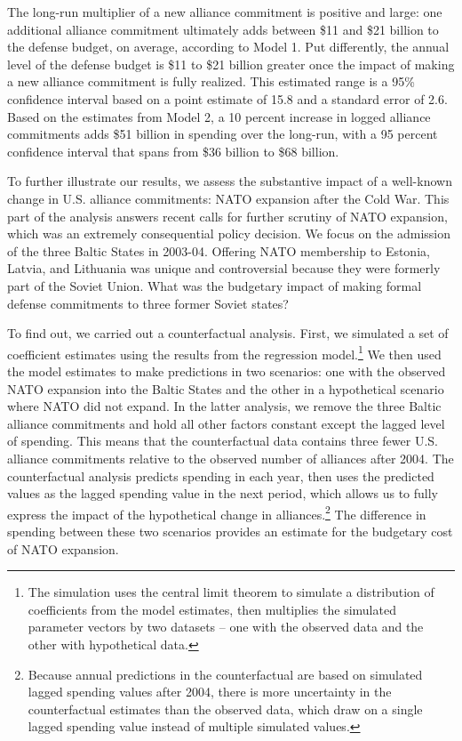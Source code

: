 \documentclass[12pt,hidelinks]{article}
\begin{document}
The long-run multiplier of a new alliance commitment is positive and large: one additional alliance commitment ultimately adds between \$11 and \$21 billion to the defense budget, on average, according to Model 1.
Put differently, the annual level of the defense budget is \$11 to \$21 billion greater once the impact of making a new alliance commitment is fully realized.
This estimated range is a 95\% confidence interval based on a point estimate of 15.8 and a standard error of 2.6. 
Based on the estimates from Model 2, a 10 percent increase in logged alliance commitments adds \$51 billion in spending over the long-run, with a 95 percent confidence interval that spans from \$36 billion to \$68 billion.


To further illustrate our results, we assess the substantive impact of a well-known change in U.S. alliance commitments: NATO expansion after the Cold War. 
This part of the analysis answers recent calls for further scrutiny of NATO expansion, which was an extremely consequential policy decision.\autocite{GoldgeierShifrinson2020}
We focus on the admission of the three Baltic States in 2003-04. 
Offering NATO membership to Estonia, Latvia, and Lithuania was unique and controversial because they were formerly part of the Soviet Union.
What was the budgetary impact of making formal defense commitments to three former Soviet states?  


To find out, we carried out a counterfactual analysis. 
First, we simulated a set of coefficient estimates using the results from the regression model.\footnote{The simulation uses the central limit theorem to simulate a distribution of coefficients from the model estimates, then multiplies the simulated parameter vectors by two datasets -- one with the observed data and the other with hypothetical data.}
We then used the model estimates to make predictions in two scenarios: one with the observed NATO expansion into the Baltic States and the other in a hypothetical scenario where NATO did not expand. 
In the latter analysis, we remove the three Baltic alliance commitments and hold all other factors constant except the lagged level of spending.
This means that the counterfactual data contains three fewer U.S. alliance commitments relative to the observed number of alliances after 2004. 
The counterfactual analysis predicts spending in each year, then uses the predicted values as the lagged spending value in the next period, which allows us to fully express the impact of the hypothetical change in alliances.\footnote{Because annual predictions in the counterfactual are based on simulated lagged spending values after 2004, there is more uncertainty in the counterfactual estimates than the observed data, which draw on a single lagged spending value instead of multiple simulated values.}
The difference in spending between these two scenarios provides an estimate for the budgetary cost of NATO expansion.
\end{document}
